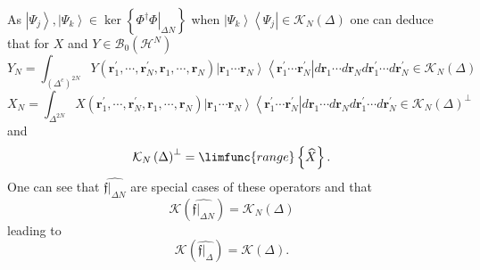 \documentclass[12pt]{article}
\begin{document}
As $\left\vert \Psi _{j}\right\rangle ,\left\vert \Psi _{k}\right\rangle \in
\ker \left\{ \left. \Phi ^{\dagger }\Phi \right\vert _{\Delta N}\right\} $
when $\left\vert \Psi _{k}\right\rangle \left\langle \Psi _{j}\right\vert
\in \mathcal{K}_{N}\left( \Delta \right) $ one can deduce that for $X$ and $%
Y\in \mathcal{B}_{0}\left( \mathcal{H}^{N}\right) $  
\begin{equation}
Y_{N}=\int_{\left( \Delta ^{c}\right) ^{2N}}Y\left( \boldsymbol{r}%
_{1}^{\prime },\cdots ,\boldsymbol{r}_{N}^{\prime },\boldsymbol{r}%
_{1},\cdots ,\boldsymbol{r}_{N}\right) \left\vert \boldsymbol{r}_{1}\cdots 
\boldsymbol{r}_{N}\right\rangle \left\langle \boldsymbol{r}_{1}^{\prime
}\cdots \boldsymbol{r}_{N}^{\prime }\right\vert d\boldsymbol{r}_{1}\cdots d%
\boldsymbol{r}_{N}d\boldsymbol{r}_{1}^{\prime }\cdots d\boldsymbol{r}%
_{N}^{\prime }\in \mathcal{K}_{N}\left( \Delta \right) 
\end{equation}
\begin{equation}
X_{N}=\int_{\Delta ^{2N}}X\left( \boldsymbol{r}_{1}^{\prime },\cdots ,%
\boldsymbol{r}_{N}^{\prime },\boldsymbol{r}_{1},\cdots ,\boldsymbol{r}%
_{N}\right) \left\vert \boldsymbol{r}_{1}\cdots \boldsymbol{r}%
_{N}\right\rangle \left\langle \boldsymbol{r}_{1}^{\prime }\cdots 
\boldsymbol{r}_{N}^{\prime }\right\vert d\boldsymbol{r}_{1}\cdots d%
\boldsymbol{r}_{N}d\boldsymbol{r}_{1}^{\prime }\cdots d\boldsymbol{r}%
_{N}^{\prime }\in \mathcal{K}_{N}\left( \Delta \right) ^{\bot }
\end{equation}%
and%
\begin{equation}
\mathcal{K}_{N}\left( \Delta \right) ^{\bot }=\limfunc{range}\left\{ 
\widehat{X}\right\} .
\end{equation}%
One can see that $\widehat{\left. \mathfrak{f}\right\vert _{\Delta N}}$ are
special cases of these operators and that 
\begin{equation}
\mathcal{K}\left( \widehat{\left. \mathfrak{f}\right\vert _{\Delta N}}%
\right) =\mathcal{K}_{N}\left( \Delta \right) 
\end{equation}%
leading to     
\begin{equation}
\mathcal{K}\left( \widehat{\left. \mathfrak{f}\right\vert _{\Delta }}\right)
=\mathcal{K}\left( \Delta \right) .
\end{equation}
\end{document}
